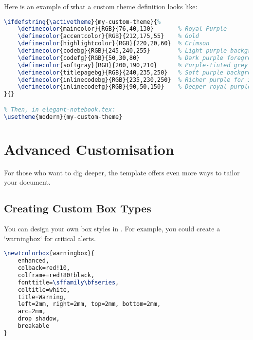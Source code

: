 \documentclass[a4paper,11pt]{report}
\begin{document}
Here is an example of what a custom theme definition looks like:
\begin{lstlisting}[language=TeX, caption={Custom theme definition in config/colours.tex}, label={lst:customtheme}]
% Add this block to config/colours.tex
\ifdefstring{\activetheme}{my-custom-theme}{%
    \definecolor{maincolor}{RGB}{76,40,130}       % Royal Purple
    \definecolor{accentcolor}{RGB}{212,175,55}    % Gold
    \definecolor{highlightcolor}{RGB}{220,20,60}  % Crimson
    \definecolor{codebg}{RGB}{245,240,255}        % Light purple background
    \definecolor{codefg}{RGB}{50,30,80}           % Dark purple foreground
    \definecolor{softgray}{RGB}{200,190,210}      % Purple-tinted grey
    \definecolor{titlepagebg}{RGB}{240,235,250}   % Soft purple background
    \definecolor{inlinecodebg}{RGB}{235,230,250}  % Richer purple for inline code
    \definecolor{inlinecodefg}{RGB}{90,50,150}    % Deeper royal purple for inline code
}{}

% Then, in elegant-notebook.tex:
\usetheme{modern}{my-custom-theme}
\end{lstlisting}

\chapter{Advanced Customisation}
For those who want to dig deeper, the template offers even more ways to tailor your document.

\section{Creating Custom Box Types}
You can design your own box styles in . For example, you could create a `warningbox` for critical alerts.
\begin{lstlisting}[language=TeX, caption={Creating a custom box type in config/settings.tex}, label={lst:custombox}]
\newtcolorbox{warningbox}{
    enhanced,
    colback=red!10,
    colframe=red!80!black,
    fonttitle=\sffamily\bfseries,
    coltitle=white,
    title=Warning,
    left=2mm, right=2mm, top=2mm, bottom=2mm,
    arc=2mm,
    drop shadow,
    breakable
}
\end{lstlisting}
\end{document}
